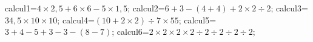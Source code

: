 \documentclass[exercice]{thedocument}%
\begin{document}
%
    \>calcul1=$4\times2,5+6\times6-5\times1,5$;%
    \>calcul2=$6+3-(4+4)+2\times2\div2$;%
    \>calcul3=$34,5\times10\times10$;%
    \>calcul4=$(10+2\times2)\div7\times55$;%
    \>calcul5=$3+4-5+3-3-(8-7)$;%
    \>calcul6=$2\times2\times2\times2\div2\div2\div2\div2$;%
\end{document}

